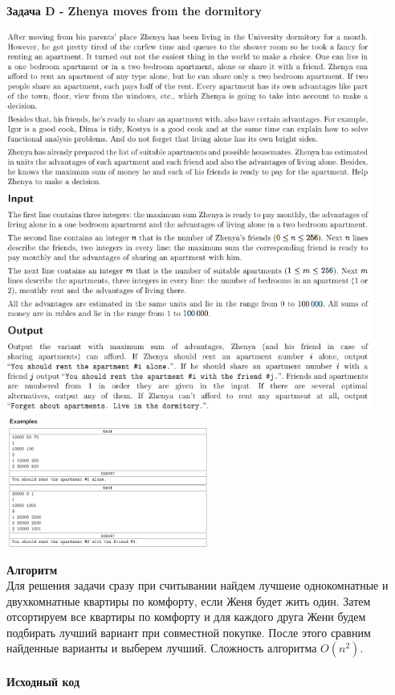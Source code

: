 \documentclass[a4paper,12pt]{article}
\begin{document}
\newpage
\textbf{{\large Задача D - Zhenya moves from the dormitory}} \\
\begin{center}
\includegraphics[width=0.9\textwidth]{CT_ACM_EAST/CT_ACM_EAST_D1.png}\\ [1cm]
\includegraphics[width=0.5\textwidth]{CT_ACM_EAST/CT_ACM_EAST_D2.png}\\ [1cm]
\end{center}
\textbf{{\large Алгоритм}} \\
Для решения задачи сразу при считывании найдем лучшеие однокомнатные и двухкомнатные квартиры по комфорту, если Женя будет жить один. Затем отсортируем все квартиры по комфорту и для каждого друга Жени будем подбирать лучший вариант при совместной покупке. После этого сравним найденные варианты и выберем лучший. Сложность алгоритма $O(n^2)$.\\
\\
\newpage
\textbf{{\large Исходный код}}
\end{document}
